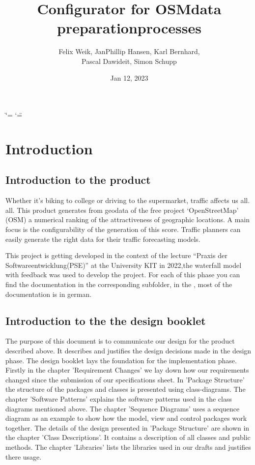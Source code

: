 \documentclass[letterpaper,10pt,english]{sphinxmanual}
\title{Configurator for
OSM\sphinxhyphen{}data preparation\sphinxhyphen{}processes}
\date{Jan 12, 2023}
\author{Felix Weik, Jan\sphinxhyphen{}Phillip Hansen, Karl Bernhard, \\ Pascal Dawideit, Simon Schupp}
\begin{document}
\ifdefined\shorthandoff
  \ifnum\catcode`\=\string=\active\shorthandoff{=}\fi
  \ifnum\catcode`\"=\active{}\fi
\fi

\pagestyle{empty}
\sphinxmaketitle
\pagestyle{plain}
\sphinxtableofcontents
\pagestyle{normal}
\label{\detokenize{index::doc}}



\chapter{Introduction}
\label{\detokenize{index:Introduction}}

\section{Introduction to the product}
\sphinxAtStartPar
Whether it’s biking to college or driving to the supermarket, traffic
affects us all. all. This product generates from geodata of the free
project ‘OpenStreetMap’ (OSM) a numerical ranking of the
attractiveness of geographic locations. A main focus is the
configurability of the generation of this score. Traffic planners can
easily generate the right data for their traffic forecasting models.

\sphinxAtStartPar
{} 

\sphinxAtStartPar
This project is getting developed in the context of the lecture “Praxis der
Softwareentwicklung(PSE)” at the University KIT in 2022,the waterfall
model with feedback was used to develop the project.
For each of this phase you can find the documentation in the
corresponding subfolder, in the  , most of the documentation is in german.


\section{Introduction to the the design booklet}
\sphinxAtStartPar
The purpose of this document is to communicate our design for the product described above. It describes and justifies the design decisions made in the design phase. The design booklet lays the foundation for the implementation phase.\\
Firstly in the chapter 'Requirement Changes' we lay down how our requirements changed since the submission of our specifications sheet. In 'Package Structure' the structure of the packages and classes is presented using class-diagrams. The chapter 'Software Patterns' explains the software patterns used in the class diagrams mentioned above. The chapter 'Sequence Diagrams' uses a sequence diagram as an example to show how the model, view and control packages work together. The details of the design presented in 'Package Structure' are shown in the chapter 'Class Descriptions'. It contains a description of all classes and public methods. The chapter 'Libraries' lists the libraries used in our drafts and justifies there usage.
\end{document}
